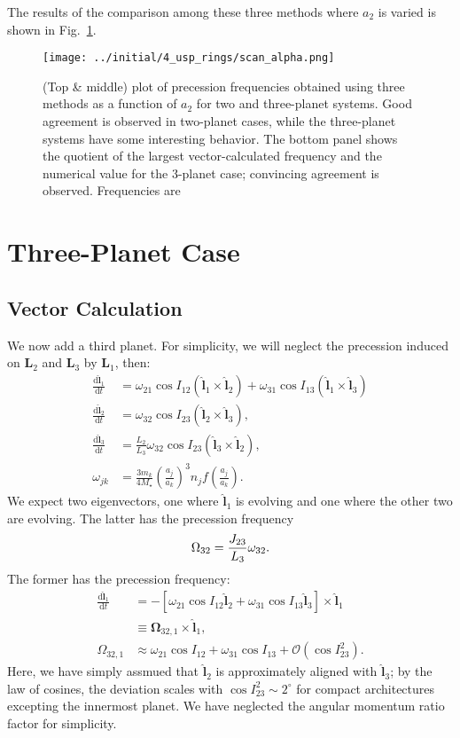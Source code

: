 \documentclass[11pt,
        usenames, %
        dvipsnames %
    ]{article}
\newcommand*{\rd}[2]{\frac{\mathrm{d}#1}{\mathrm{d}#2}}
\newcommand*{\bm}[1]{\boldsymbol{\mathbf{#1}}}
\newcommand*{\uv}[1]{\hat{\bm{#1}}}
\newcommand*{\p}[1]{\left(#1\right)}
\newcommand*{\s}[1]{\left[#1\right]}
\begin{document}
The results of the comparison among these three methods where $a_2$ is varied is
shown in Fig.~\ref{fig:scan}.
\begin{figure}
    \centering
    \texttt{[image: ../initial/4\_usp\_rings/scan\_alpha.png]}
    \caption{(Top \& middle) plot of precession frequencies obtained using three
    methods as a function of $a_2$ for two and three-planet systems. Good
    agreement is observed in two-planet cases, while the three-planet systems
    have some interesting behavior. The bottom panel shows the quotient of the
    largest vector-calculated frequency and the numerical value for the 3-planet
    case; convincing agreement is observed. Frequencies are }\label{fig:scan}
\end{figure}

\section{Three-Planet Case}

\subsection{Vector Calculation}

We now add a third planet. For simplicity, we will neglect the precession
induced on $\bm{L}_2$ and $\bm{L}_3$ by $\bm{L}_1$, then:
\begin{align}
    \rd{\uv{l}_1}{t} &= \omega_{21}\cos I_{12} \p{\uv{l}_1 \times \uv{l}_2}
        + \omega_{31}\cos I_{13} \p{\uv{l}_1 \times \uv{l}_3}
        \nonumber\\
    \rd{\uv{l}_2}{t} &= \omega_{32}\cos I_{23} \p{\uv{l}_2 \times \uv{l}_3},\\
    \rd{\uv{l}_3}{t} &= \frac{L_2}{L_3}
        \omega_{32}\cos I_{23} \p{\uv{l}_3 \times \uv{l}_2},\\
    \omega_{jk}
        &= \frac{3 m_k}{4 M_\star}\p{\frac{a_j}{a_k}}^3 n_j
            f\p{\frac{a_j}{a_k}}.
\end{align}
We expect two eigenvectors, one where $\uv{l}_1$ is evolving and one where the
other two are evolving. The latter has the precession frequency
\begin{equation}
    \Omega_{\rm 32} = \frac{J_{23}}{L_3}\omega_{32}.
\end{equation}
The former has the precession frequency:
\begin{align}
    \rd{\uv{l}_1}{t} &= -\s{
        \omega_{21}\cos I_{12} \uv{l}_2 + \omega_{31}\cos I_{13} \uv{l}_3
    } \times \uv{l}_1 \nonumber\\
        &\equiv \bm{\Omega}_{32,1} \times \uv{l}_1,\\
    \Omega_{32, 1}
        &\approx \omega_{21} \cos I_{12}
            + \omega_{31}\cos I_{13}
            + \mathcal{O}\p{\cos I_{23}^2}.
\end{align}
Here, we have simply assmued that $\uv{l}_2$ is approximately aligned with
$\uv{l}_3$; by the law of cosines, the deviation scales with $\cos I_{23}^2 \sim
2^\circ$ for compact architectures excepting the innermost planet. We have
neglected the angular momentum ratio factor for simplicity.
\end{document}
